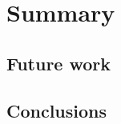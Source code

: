 \documentclass[thesis]{subfiles}
\begin{document}




\chapter{Summary}

%
%
%
%

\section{Future work}
\label{sec:future_work}


\section{Conclusions}
\end{document}
